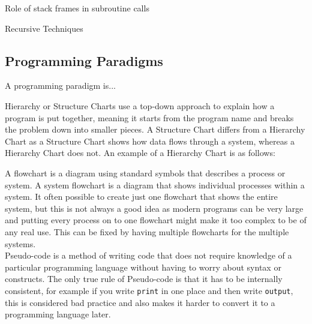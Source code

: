   \noindent
  Role of stack frames in subroutine calls
  
  \noindent
  Recursive Techniques
\subsection{Programming Paradigms}
  \noindent
  A programming paradigm is...

  \noindent
  Hierarchy or Structure Charts use a top-down approach to explain how a program is put together, meaning it starts from the program name and breaks the problem down into smaller pieces. A Structure Chart differs from a Hierarchy Chart as a Structure Chart shows how data flows through a system, whereas a Hierarchy Chart does not. An example of a Hierarchy Chart is as follows:
  \begin{figure}[H]
    \centering
  \end{figure}
  \noindent
  A flowchart is a diagram using standard symbols that describes a process or system. A system flowchart is a diagram that shows individual processes within a system. It often possible to create just one flowchart that shows the entire system, but this is not always a good idea as modern programs can be very large and putting every process on to one flowchart might make it too complex to be of any real use. This can be fixed by having multiple flowcharts for the multiple systems.\\
  Pseudo-code is a method of writing code that does not require knowledge of a particular programming language without having to worry about syntax or constructs. The only true rule of Pseudo-code is that it has to be internally consistent, for example if you write \verb|print| in one place and then write \verb|output|, this is considered bad practice and also makes it harder to convert it to a programming language later.\\
